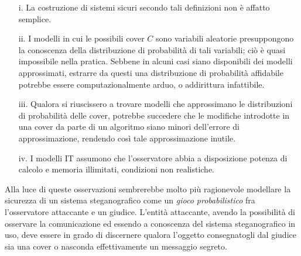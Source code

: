 		\begin{itemize}
		\item[i.] La costruzione di sistemi sicuri secondo tali definizioni non è affatto semplice.
		\item[ii.] I modelli in cui le possibili cover $C$ sono variabili aleatorie presuppongono la conoscenza della distribuzione di probabilità di tali variabili; ciò è quasi impossibile nella pratica. Sebbene in alcuni casi siano disponibili dei modelli approssimati, estrarre da questi una distribuzione di probabilità affidabile potrebbe essere computazionalmente arduo, o addirittura infattibile.
		\item[iii.] Qualora si riuscissero a trovare modelli che approssimano le distribuzioni di probabilità delle cover, potrebbe succedere che le modifiche introdotte in una cover da parte di un algoritmo siano minori dell'errore di approssimazione, rendendo così tale approssimazione inutile.
		\item[iv.] I modelli IT assumono che l'osservatore abbia a disposizione potenza di calcolo e memoria illimitati, condizioni non realistiche.
		\end{itemize}
		Alla luce di queste osservazioni sembrerebbe molto più ragionevole modellare la sicurezza di un sistema steganografico come un \textit{gioco probabilistico} fra l'osservatore attaccante e un giudice. L'entità attaccante, avendo la possibilità di osservare la comunicazione ed essendo a conoscenza del sistema steganografico in uso, deve essere in grado di discernere qualora l'oggetto consegnatogli dal giudice sia una cover o nasconda effettivamente un messaggio segreto.

